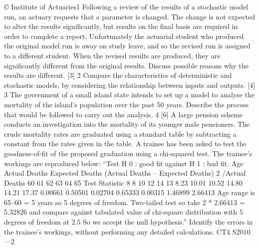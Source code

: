 \documentclass[a4paper,12pt]{article}
\begin{document}
\begin{enumerate}

© Institute of Actuaries1
Following a review of the results of a stochastic model run, an actuary requests that a
parameter is changed. The change is not expected to alter the results significantly,
but results on the final basis are required in order to complete a report. Unfortunately
the actuarial student who produced the original model run is away on study leave, and
so the revised run is assigned to a different student.
When the revised results are produced, they are significantly different from the
original results.
Discuss possible reasons why the results are different.
[3]
2 Compare the characteristics of deterministic and stochastic models, by considering the
relationship between inputs and outputs.
[4]
3 The government of a small island state intends to set up a model to analyse the
mortality of the island’s population over the past 50 years.
Describe the process that would be followed to carry out the analysis.
4
[6]
A large pension scheme conducts an investigation into the mortality of its younger
male pensioners. The crude mortality rates are graduated using a standard table by
subtracting a constant from the rates given in the table.
A trainee has been asked to test the goodness-of-fit of the proposed graduation using
a chi-squared test. The trainee’s workings are reproduced below:
“Test H 0 : good fit against H 1 : bad fit.
Age Actual Deaths Expected Deaths (Actual Deaths –
Expected Deaths) 2
/Actual Deaths
60
61
62
63
64
65
Test Statistic 8
8
10
12
14
13 8.23
10.01
10.52
14.80
14.21
17.37 0.00661
0.50501
0.02704
0.65333
0.00315
1.46899
2.66413
Age range is 65–60 = 5 years so 5 degrees of freedom.
Two-tailed test so take 2 * 2.66413 = 5.32826 and compare against tabulated value of
chi-square distribution with 5 degrees of freedom at 2.5%
So we accept the null hypothesis.”
Identify the errors in the trainee’s workings, without performing any detailed
calculations.
CT4 S2010—2


\newpage















\end{enumerate}
\end{document}

